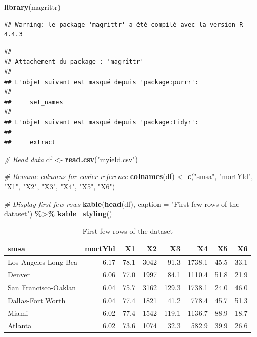 \documentclass[
  12pt,
]{article}
\newenvironment{Shaded}{\begin{snugshade}}{\end{snugshade}}
\newcommand{\AttributeTok}[1]{\textcolor[rgb]{0.13,0.29,0.53}{#1}}
\newcommand{\CommentTok}[1]{\textcolor[rgb]{0.56,0.35,0.01}{\textit{#1}}}
\newcommand{\FunctionTok}[1]{\textcolor[rgb]{0.13,0.29,0.53}{\textbf{#1}}}
\newcommand{\NormalTok}[1]{#1}
\newcommand{\OtherTok}[1]{\textcolor[rgb]{0.56,0.35,0.01}{#1}}
\newcommand{\SpecialCharTok}[1]{\textcolor[rgb]{0.81,0.36,0.00}{\textbf{#1}}}
\newcommand{\StringTok}[1]{\textcolor[rgb]{0.31,0.60,0.02}{#1}}
\begin{document}
\begin{Shaded}
\begin{Highlighting}[]
\FunctionTok{library}\NormalTok{(magrittr)}
\end{Highlighting}
\end{Shaded}

\begin{verbatim}
## Warning: le package 'magrittr' a été compilé avec la version R 4.4.3
\end{verbatim}

\begin{verbatim}
## 
## Attachement du package : 'magrittr'
## 
## L'objet suivant est masqué depuis 'package:purrr':
## 
##     set_names
## 
## L'objet suivant est masqué depuis 'package:tidyr':
## 
##     extract
\end{verbatim}

\begin{Shaded}
\begin{Highlighting}[]
\CommentTok{\# Read data}
\NormalTok{df }\OtherTok{\textless{}{-}} \FunctionTok{read.csv}\NormalTok{(}\StringTok{"myield.csv"}\NormalTok{)}

\CommentTok{\# Rename columns for easier reference}
\FunctionTok{colnames}\NormalTok{(df) }\OtherTok{\textless{}{-}} \FunctionTok{c}\NormalTok{(}\StringTok{"smsa"}\NormalTok{, }\StringTok{"mortYld"}\NormalTok{, }\StringTok{"X1"}\NormalTok{, }\StringTok{"X2"}\NormalTok{, }\StringTok{"X3"}\NormalTok{, }\StringTok{"X4"}\NormalTok{, }\StringTok{"X5"}\NormalTok{, }\StringTok{"X6"}\NormalTok{)}

\CommentTok{\# Display first few rows}
\FunctionTok{kable}\NormalTok{(}\FunctionTok{head}\NormalTok{(df), }\AttributeTok{caption =} \StringTok{"First few rows of the dataset"}\NormalTok{) }\SpecialCharTok{\%\textgreater{}\%} \FunctionTok{kable\_styling}\NormalTok{()}
\end{Highlighting}
\end{Shaded}

\begin{longtable}[t]{lrrrrrrr}
\caption{\label{tab:unnamed-chunk-1}First few rows of the dataset}\\
\toprule
smsa & mortYld & X1 & X2 & X3 & X4 & X5 & X6\\
\midrule
Los Angeles-Long Bea & 6.17 & 78.1 & 3042 & 91.3 & 1738.1 & 45.5 & 33.1\\
Denver & 6.06 & 77.0 & 1997 & 84.1 & 1110.4 & 51.8 & 21.9\\
San Francisco-Oaklan & 6.04 & 75.7 & 3162 & 129.3 & 1738.1 & 24.0 & 46.0\\
Dallas-Fort Worth & 6.04 & 77.4 & 1821 & 41.2 & 778.4 & 45.7 & 51.3\\
Miami & 6.02 & 77.4 & 1542 & 119.1 & 1136.7 & 88.9 & 18.7\\
\addlinespace
Atlanta & 6.02 & 73.6 & 1074 & 32.3 & 582.9 & 39.9 & 26.6\\
\bottomrule
\end{longtable}
\end{document}
